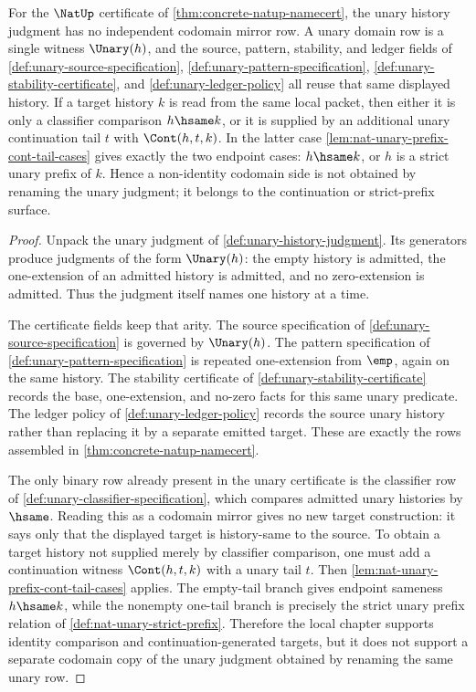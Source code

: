 \begin{proposition}
\label{prop:nat-unary-history-codomain-mirror-boundary}
For the $\NatUp$ certificate of \autoref{thm:concrete-natup-namecert}, the unary history judgment has no independent codomain mirror row. A unary domain row is a single witness $\Unary(h)$, and the source, pattern, stability, and ledger fields of \autoref{def:unary-source-specification}, \autoref{def:unary-pattern-specification}, \autoref{def:unary-stability-certificate}, and \autoref{def:unary-ledger-policy} all reuse that same displayed history. If a target history $k$ is read from the same local packet, then either it is only a classifier comparison $h\hsame k$, or it is supplied by an additional unary continuation tail $t$ with $\Cont(h,t,k)$. In the latter case \autoref{lem:nat-unary-prefix-cont-tail-cases} gives exactly the two endpoint cases: $h\hsame k$, or $h$ is a strict unary prefix of $k$. Hence a non-identity codomain side is not obtained by renaming the unary judgment; it belongs to the continuation or strict-prefix surface.
\end{proposition}
\begin{proof}
Unpack the unary judgment of \autoref{def:unary-history-judgment}. Its generators produce judgments of the form $\Unary(h)$: the empty history is admitted, the one-extension of an admitted history is admitted, and no zero-extension is admitted. Thus the judgment itself names one history at a time.

The certificate fields keep that arity. The source specification of \autoref{def:unary-source-specification} is governed by $\Unary(h)$. The pattern specification of \autoref{def:unary-pattern-specification} is repeated one-extension from $\emp$, again on the same history. The stability certificate of \autoref{def:unary-stability-certificate} records the base, one-extension, and no-zero facts for this same unary predicate. The ledger policy of \autoref{def:unary-ledger-policy} records the source unary history rather than replacing it by a separate emitted target. These are exactly the rows assembled in \autoref{thm:concrete-natup-namecert}.

The only binary row already present in the unary certificate is the classifier row of \autoref{def:unary-classifier-specification}, which compares admitted unary histories by $\hsame$. Reading this as a codomain mirror gives no new target construction: it says only that the displayed target is history-same to the source. To obtain a target history not supplied merely by classifier comparison, one must add a continuation witness $\Cont(h,t,k)$ with a unary tail $t$. Then \autoref{lem:nat-unary-prefix-cont-tail-cases} applies. The empty-tail branch gives endpoint sameness $h\hsame k$, while the nonempty one-tail branch is precisely the strict unary prefix relation of \autoref{def:nat-unary-strict-prefix}. Therefore the local chapter supports identity comparison and continuation-generated targets, but it does not support a separate codomain copy of the unary judgment obtained by renaming the same unary row.
\end{proof}
